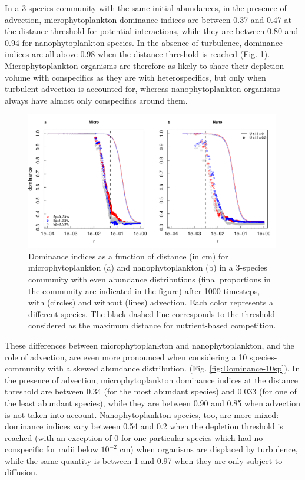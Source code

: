 \documentclass[english]{article}
\begin{document}
In a 3-species community with the same initial abundances, in the
presence of advection, microphytoplankton dominance indices are between
0.37 and 0.47 at the distance threshold for potential interactions,
while they are between 0.80 and 0.94 for nanophytoplankton species.
In the absence of turbulence, dominance indices are all above 0.98
when the distance threshold is reached (Fig. \ref{fig:Dominance-3sp}).
Microphytoplankton organisms are therefore as likely to share their
depletion volume with conspecifics as they are with heterospecifics,
but only when turbulent advection is accounted for, whereas nanophytoplankton
organisms always have almost only conspecifics around them.

\begin{figure}[H]
\begin{centering}
\includegraphics[width=0.99\textwidth]{../code/figure/dominance_diatom_nano_compare_advection}
\par\end{centering}
\caption{Dominance indices as a function of distance (in cm) for microphytoplankton
(a) and nanophytoplankton (b) in a 3-species community with even abundance
distributions (final proportions in the community are indicated in
the figure) after 1000 timesteps, with (circles) and without (lines)
advection. Each color represents a different species. The black dashed
line corresponds to the threshold considered as the maximum distance
for nutrient-based competition.\label{fig:Dominance-3sp} }
\end{figure}

These differences between microphytoplankton and nanophytoplankton,
and the role of advection, are even more pronounced when considering
a 10 species-community with a skewed abundance distribution. (Fig.
\ref{fig:Dominance-10sp}). In the presence of advection, microphytoplankton
dominance indices at the distance threshold are between 0.34 (for
the most abundant species) and 0.033 (for one of the least abundant
species), while they are between 0.90 and 0.85 when advection is not
taken into account. Nanophytoplankton species, too, are more mixed:
dominance indices vary between 0.54 and 0.2 when the depletion threshold
is reached (with an exception of 0 for one particular species which
had no conspecific for radii below $10^{-2}$ cm) when organisms are
displaced by turbulence, while the same quantity is between 1 and
0.97 when they are only subject to diffusion.
\end{document}
